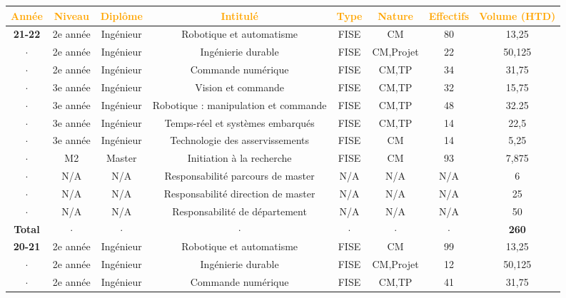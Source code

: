 \documentclass[a4paper,12pt]{article}
\begin{document}
\newpage

{\centering
\setlength{\tabcolsep}{2pt} %

\begin{tabular}{cccccccc} \toprule
    \textcolor{orange}{Année} & \textcolor{orange}{Niveau} & \textcolor{orange}{Diplôme} & \textcolor{orange}{Intitulé} & \textcolor{orange}{Type} & \textcolor{orange}{Nature} & \textcolor{orange}{Effectifs} & \textcolor{orange}{Volume (HTD)} \\ \midrule
 \bf{21-22} & 2e année  & Ingénieur & Robotique et automatisme & FISE & CM & 80 & 13,25 \\
 $\cdot$ & 2e année  & Ingénieur & Ingénierie durable  & FISE & CM,Projet & 22  & 50,125  \\
  $\cdot$ & 2e année  & Ingénieur & Commande numérique  & FISE & CM,TP & 34  & 31,75  \\
  $\cdot$ & 3e année  & Ingénieur & Vision et commande & FISE & CM,TP & 32 & 15,75  \\
  $\cdot$ & 3e année  & Ingénieur & Robotique : manipulation et commande & FISE & CM,TP & 48 & 32.25  \\
  $\cdot$ & 3e année  & Ingénieur & Temps-réel et systèmes embarqués & FISE & CM,TP & 14 & 22,5  \\
  $\cdot$ & 3e année  & Ingénieur & Technologie des asservissements & FISE & CM & 14 & 5,25  \\
  $\cdot$ & M2        & Master    & Initiation à la recherche & FISE & CM & 93 & 7,875  \\
  $\cdot$ & N/A       & N/A       & Responsabilité parcours de master & N/A & N/A & N/A & 6  \\
  $\cdot$ & N/A       & N/A       & Responsabilité direction de master & N/A & N/A & N/A & 25  \\
  $\cdot$ & N/A       & N/A       & Responsabilité de département & N/A & N/A & N/A & 50  \\
 \bf{Total} & $\cdot$ & $\cdot$ & $\cdot$ & $\cdot$ & $\cdot$ & $\cdot$ &  {\bf 260} \\\midrule
  \bf{20-21} & 2e année  & Ingénieur & Robotique et automatisme & FISE & CM & 99 & 13,25 \\
 $\cdot$ & 2e année  & Ingénieur & Ingénierie durable  & FISE & CM,Projet & 12  & 50,125  \\
  $\cdot$ & 2e année  & Ingénieur & Commande numérique  & FISE & CM,TP & 41  & 31,75  \\

\end{tabular}}
\end{document}
